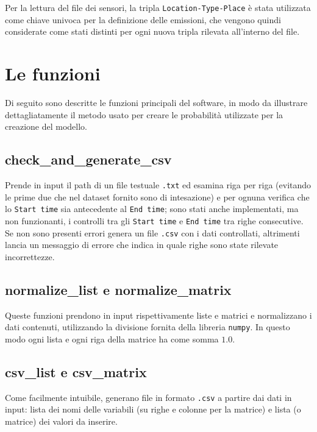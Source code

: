 \documentclass[12pt, a4paper]{scrartcl}
\begin{document}
Per la lettura del file dei sensori, la tripla \texttt{Location-Type-Place} è stata utilizzata come chiave univoca per la definizione delle emissioni, che vengono quindi considerate come stati distinti per ogni nuova tripla rilevata all'interno del file.

\section*{Le funzioni}
Di seguito sono descritte le funzioni principali del software, in modo da illustrare dettagliatamente il metodo usato per creare le probabilità utilizzate per la creazione del modello.

\subsection*{check\_and\_generate\_csv}
Prende in input il path di un file testuale \texttt{.txt} ed esamina riga per riga (evitando le prime due che nel dataset fornito sono di intesazione) e per ognuna verifica che lo \texttt{Start time} sia antecedente al \texttt{End time}; sono stati anche implementati, ma non funzionanti, i controlli tra gli \texttt{Start time} e \texttt{End time} tra righe consecutive. Se non sono presenti errori genera un file \texttt{.csv} con i dati controllati, altrimenti lancia un messaggio di errore che indica in quale righe sono state rilevate incorrettezze.

\subsection*{normalize\_list e normalize\_matrix}
Queste funzioni prendono in input rispettivamente liste e matrici e normalizzano i dati contenuti, utilizzando la divisione fornita della libreria \texttt{numpy}. In questo modo ogni lista e ogni riga della matrice ha come somma $1.0$.

\subsection*{csv\_list e csv\_matrix}
Come facilmente intuibile, generano file in formato \texttt{.csv} a partire dai dati in input: lista dei nomi delle variabili (su righe e colonne per la matrice) e lista (o matrice) dei valori da inserire.
\end{document}
